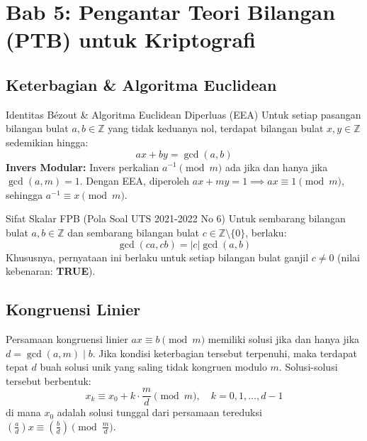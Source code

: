 \documentclass[11pt,a4paper]{article}
\begin{document}
\newpage
\section{Bab 5: Pengantar Teori Bilangan (PTB) untuk Kriptografi}

\subsection{Keterbagian \& Algoritma Euclidean}
\begin{thmbox}{Identitas B\'ezout \& Algoritma Euclidean Diperluas (EEA)}
Untuk setiap pasangan bilangan bulat $a, b \in \mathbb{Z}$ yang tidak keduanya nol, terdapat bilangan bulat $x, y \in \mathbb{Z}$ sedemikian hingga:
\[
a x + b y = \gcd(a, b)
\]
\textbf{Invers Modular:} Invers perkalian $a^{-1} \pmod m$ ada jika dan hanya jika $\gcd(a, m) = 1$. Dengan EEA, diperoleh $ax + my = 1 \implies ax \equiv 1 \pmod m$, sehingga $a^{-1} \equiv x \pmod m$.
\end{thmbox}

\begin{thmbox}{Sifat Skalar FPB (Pola Soal UTS 2021-2022 No 6)}
Untuk sembarang bilangan bulat $a, b \in \mathbb{Z}$ dan sembarang bilangan bulat $c \in \mathbb{Z} \setminus \{0\}$, berlaku:
\[
\gcd(ca, cb) = |c| \gcd(a, b)
\]
Khususnya, pernyataan ini berlaku untuk setiap bilangan bulat ganjil $c \neq 0$ (nilai kebenaran: \textbf{TRUE}).
\end{thmbox}

\subsection{Kongruensi Linier}
Persamaan kongruensi linier $ax \equiv b \pmod m$ memiliki solusi jika dan hanya jika $d = \gcd(a, m) \mid b$.
Jika kondisi keterbagian tersebut terpenuhi, maka terdapat tepat $d$ buah solusi unik yang saling tidak kongruen modulo $m$. Solusi-solusi tersebut berbentuk:
\[
x_k \equiv x_0 + k \cdot \frac{m}{d} \pmod m, \quad k = 0, 1, \dots, d - 1
\]
di mana $x_0$ adalah solusi tunggal dari persamaan tereduksi $\left(\frac{a}{d}\right) x \equiv \left(\frac{b}{d}\right) \pmod{\frac{m}{d}}$.
\end{document}
